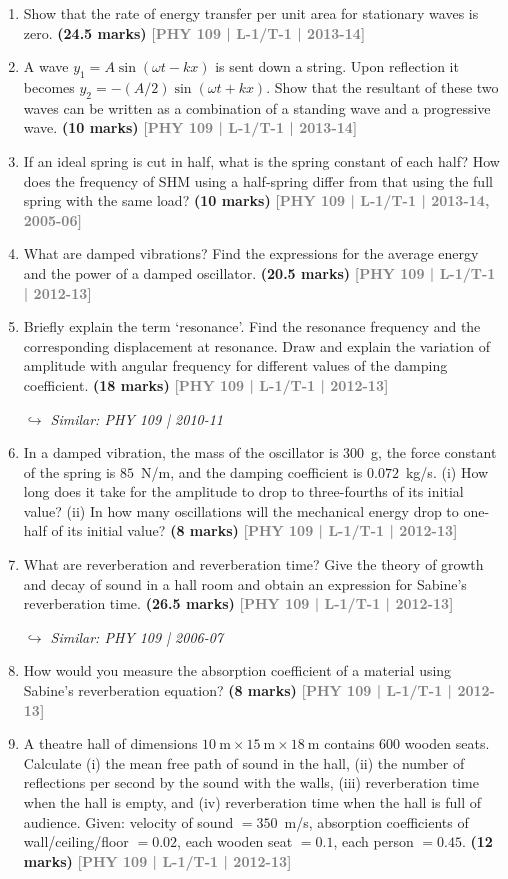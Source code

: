 \documentclass[12pt,a3paper]{article}
\newcommand{\yr}[1]{\hfill\textcolor{gray}{\small\textbf{[#1]}}}
\newcommand{\mk}[1]{\textcolor{orange!70!black}{\small\textbf{(#1 marks)}}}
\newcommand{\variant}[1]{\par\vspace{1pt}\textcolor{blue!50!black}%
  {\footnotesize\textit{$\hookrightarrow$ Similar: #1}}}
\begin{document}
\begin{enumerate}
\item Show that the rate of energy transfer per unit area for stationary waves is zero.
\mk{24.5} \yr{PHY 109 | L-1/T-1 | 2013-14}

\item A wave $y_1 = A\sin(\omega t - kx)$ is sent down a string. Upon reflection it becomes $y_2 = -(A/2)\sin(\omega t + kx)$. Show that the resultant of these two waves can be written as a combination of a standing wave and a progressive wave.
\mk{10} \yr{PHY 109 | L-1/T-1 | 2013-14}

\item If an ideal spring is cut in half, what is the spring constant of each half? How does the frequency of SHM using a half-spring differ from that using the full spring with the same load?
\mk{10} \yr{PHY 109 | L-1/T-1 | 2013-14, 2005-06}

\item What are damped vibrations? Find the expressions for the average energy and the power of a damped oscillator.
\mk{20.5} \yr{PHY 109 | L-1/T-1 | 2012-13}

\item Briefly explain the term `resonance'. Find the resonance frequency and the corresponding displacement at resonance. Draw and explain the variation of amplitude with angular frequency for different values of the damping coefficient.
\mk{18} \yr{PHY 109 | L-1/T-1 | 2012-13}
\variant{PHY 109 | 2010-11}

\item In a damped vibration, the mass of the oscillator is $300$~g, the force constant of the spring is $85$~N/m, and the damping coefficient is $0.072$~kg/s. (i) How long does it take for the amplitude to drop to three-fourths of its initial value? (ii) In how many oscillations will the mechanical energy drop to one-half of its initial value?
\mk{8} \yr{PHY 109 | L-1/T-1 | 2012-13}

\item What are reverberation and reverberation time? Give the theory of growth and decay of sound in a hall room and obtain an expression for Sabine's reverberation time.
\mk{26.5} \yr{PHY 109 | L-1/T-1 | 2012-13}
\variant{PHY 109 | 2006-07}

\item How would you measure the absorption coefficient of a material using Sabine's reverberation equation?
\mk{8} \yr{PHY 109 | L-1/T-1 | 2012-13}

\item A theatre hall of dimensions $10\ \text{m}\times15\ \text{m}\times18\ \text{m}$ contains 600 wooden seats. Calculate (i) the mean free path of sound in the hall, (ii) the number of reflections per second by the sound with the walls, (iii) reverberation time when the hall is empty, and (iv) reverberation time when the hall is full of audience. Given: velocity of sound $= 350$~m/s, absorption coefficients of wall/ceiling/floor $= 0.02$, each wooden seat $= 0.1$, each person $= 0.45$.
\mk{12} \yr{PHY 109 | L-1/T-1 | 2012-13}


\end{enumerate}
\end{document}
